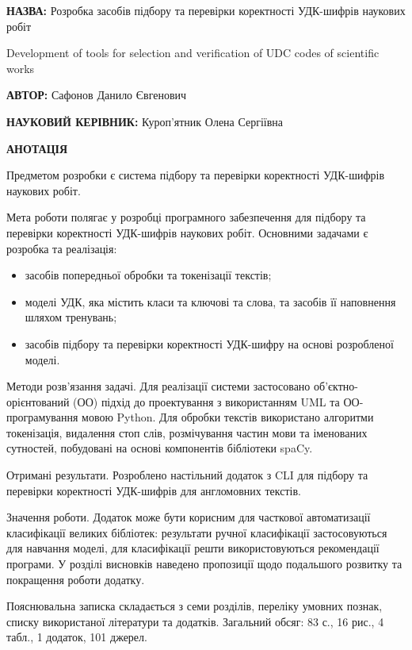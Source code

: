 \documentclass[14pt]{extarticle}
\begin{document}
\noindent
\textbf{НАЗВА:} Розробка засобів підбору та перевірки коректності
УДК-шифрів наукових робіт

\noindent
Development of tools for selection and
verification of UDC codes of scientific works

\vspace{\baselineskip}

\noindent
\textbf{АВТОР:} Сафонов Данило Євгенович

\noindent
\textbf{НАУКОВИЙ КЕРІВНИК:} Куроп'ятник Олена Сергіївна

\vspace{\baselineskip}

\noindent
\textbf{АНОТАЦІЯ}

Предметом розробки є система підбору та перевірки коректності
УДК-шифрів наукових робіт.

Мета роботи полягає у розробці програмного забезпечення
для підбору та перевірки коректності УДК-шифрів наукових робіт.
Основними задачами є розробка та реалізація:
\begin{itemize}[itemsep=1pt,labelindent=\dimexpr{}\relax, leftmargin=*]
  \item засобів попередньої обробки та токенізації текстів;
  \item моделі УДК, яка містить класи та ключові та слова, та засобів її наповнення шляхом тренувань;
  \item засобів підбору та перевірки коректності УДК-шифру на основі розробленої моделі.
\end{itemize}

Методи розв’язання задачі.
Для реалізації системи застосовано об’єктно-орієнтований (ОО)
підхід до проектування з використанням UML та ОО-програмування мовою Python.
Для обробки текстів використано алгоритми токенізація, видалення стоп слів,
розмічування частин мови та іменованих сутностей,
побудовані на основі компонентів бібліотеки spaCy.

Отримані результати.
Розроблено настільний додаток з CLI для підбору та перевірки коректності
УДК-шифрів для англомовних текстів.

Значення роботи. Додаток може бути корисним для часткової
автоматизації класифікації великих бібліотек: результати ручної класифікації
застосовуються для навчання моделі, для класифікації решти використовуються
рекомендації програми. У розділі висновків наведено пропозиції щодо
подальшого розвитку та покращення роботи додатку.

Пояснювальна записка складається з семи розділів, переліку умовних познак,
списку використаної літератури та додатків.
Загальний обсяг: 83 с., 16 рис., 4 табл., 1 додаток, 101 джерел.
\end{document}
